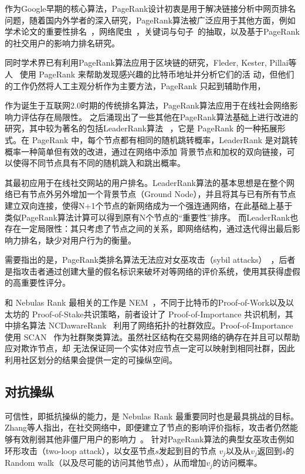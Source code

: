 作为Google早期的核心算法，PageRank设计初衷是用于解决链接分析中网页排名问题，随着国内外学者的深入研究，PageRank算法被广泛应用于其他方面，例如学术论文的重要性排名~\cite{}，网络爬虫~\cite{}，关键词与句子~\cite{}的抽取，以及基于PageRank的社交用户的影响力排名研究。

同时学术界已有利用PageRank算法应用于区块链的研究，Fleder, Kester, Pillai等人~\cite{Fleder2015} 使用 PageRank 来帮助发现感兴趣的比特币地址并分析它们的活 动，但他们的工作仍然将人工主观分析作为主要方法，PageRank 只起到辅助作用，

作为诞生于互联网2.0时期的传统排名算法，PageRank算法应用于在线社会网络影响力评估存在局限性。
之后涌现出了一些其他在PageRank算法基础上进行改进的研究，其中较为著名的包括LeaderRank算法 ~\cite{Li2014}，它是 PageRank 的一种拓展形式。在 PageRank 中，每个节点都有相同的随机跳转概率，LeaderRank 是对跳转概率一种简单但有效的改进，通过在网络中添加 背景节点和加权的双向链接，可以使得不同节点具有不同的随机跳入和跳出概率。

其最初应用于在线社交网站的用户排名。LeaderRank算法的基本思想是在整个网络已有节点外另外增加一个背景节点（Ground Node），并且将其与已有所有节点建立双向连接，使得N+1个节点的新网络成为一个强连通网络，在此基础上基于类似PageRank算法计算可以得到原有N个节点的“重要性”排序。
而LeaderRank也存在一定局限性：其只考虑了节点之间的关系，即网络结构，通过迭代得出最后影响力排名，缺少对用户行为的衡量。

需要指出的是，PageRank类排名算法无法应对女巫攻击（sybil attacks）~\cite{cheng2006manipulability}，后者是指攻击者通过创建大量的假名标识来破坏对等网络的评价系统，使用其获得虚假的高重要性评分。


和 Nebulas Rank 最相关的工作是 NEM~\cite{nem}，不同于比特币的Proof-of-Work以及以太坊的 Proof-of-Stake共识策略，前者设计了 Proof-of-Importance 共识机制，其中排名算法 NCDawareRank ~\cite{Nikolakopoulos2013}利用了网络拓扑的社群效应。Proof-of-Importance 使用 SCAN ~\cite{xu2007scan}\cite{shiokawa2015scan}\cite{chang2017mathsf}作为社群聚类算法。虽然社区结构在交易网络的确存在并且可以帮助应对欺诈节点，却 无法保证同一个实体对应节点一定可以映射到相同社群，因此利用社区划分的结果会提供一定的可操纵空间。


\subsection{对抗操纵}
可信性，即抵抗操纵的能力，是 Nebulas Rank 最重要同时也是最具挑战的目标。Zhang等人指出，在社交网络中，即便建立了节点的影响评价指标，攻击者仍然能够有效削弱其他非僵尸用户的影响力~\cite{zhang2016truetop}。
针对PageRank算法的典型女巫攻击例如环形攻击（two-loop attack），以女巫节点$s$发起到目的节点
$v_j$以及从$v_j$返回到$s$的Random walk（以及尽可能的访问其他节点），从而增加$v_j$的访问概率。


